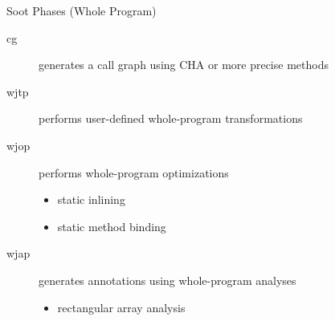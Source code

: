\begin{slide}{Soot Phases (Whole Program)}
\begin{description}
\item[cg] generates a call graph using CHA or more precise methods
\item[wjtp] performs user-defined whole-program transformations
\item[wjop] performs whole-program optimizations
\begin{itemize}
\item static inlining
\item static method binding
\end{itemize}
\item[wjap] generates annotations using whole-program analyses
\begin{itemize}
\item rectangular array analysis
\end{itemize}
\end{description}
\end{slide}



